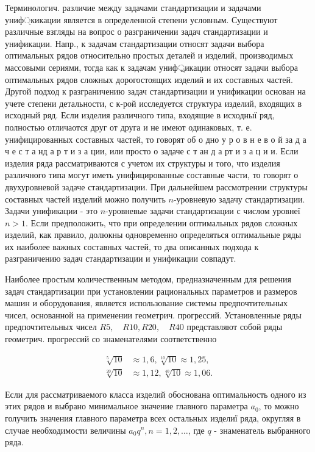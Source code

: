 \documentclass[10pt]{article}
\begin{document}
Терминологич. различие между задачами стандартизации и задачами униф্кикации является в определенноӥ степени условным. Существуют различные взгляды на вопрос о разграничении задач стандартизации и унификации. Напр., к задачам стандартизации относят задачи выбора оптимальных рядов относительно простых деталей и изделий, производимых массовыми сериями, тогда как к задачам униф্রикации относят задачи выбора оптимальных рядов сложных дорогостоящих изделий и их составных частей. Другой подход к разграничению задач стандартизации и унификации основан на учете степени детальности, с к-рой исследуется структура изделий, входящих в исходный ряд. Если изделия различного типа, входящие в исходныї ряд, полностью отличаотся друг от друга и не имеют одинаковых, т. е. унифицированных составных частей, то говорят об о дно у р о в н е в о й за д а ч е с т а нд а р т и з а ции, или просто о задаче с т ан д а рт и з а ц и и. Если изделия ряда рассматриваются с учетом их структуры и того, что изделия различного типа могут иметь унифицированные составные части, то говорят о двухуровневой задаче стандартизации. При дальнейшем рассмотрении структуры составных частей изделий можно получить $n$-уровневую задачу стандартизации. Задачи унификации - это $n$-уровневые задачи стандартизации с числом уровнеї $n>1$. Если предположить, что при определении оптимальных рядов сложных изделий, как правило, долюкны одновременно определяться оптимальные ряды их наиболее важных составных частей, то два описанных подхода к разграничению задач стандартизации и унификации совпадут.



Наиболее простым количественным методом, предназначенным для решения задач стандартизации при установлении рациональных параметров и размеров машин и оборудования, является использование системы предпочтительных чисел, основанной на применении геометрич. прогрессий. Установленные ряды предпочтительных чисел $R 5, \quad R 10, R 20, \quad R 40$ представляют собой ряды геометрич. прогрессий со знаменателями соответственно



\[

\begin{aligned}

\sqrt[5]{10} & \approx 1,6, \sqrt[10]{10} \approx 1,25, \\

\sqrt[20]{10} & \approx 1,12, \sqrt[40]{10} \approx 1,06 .

\end{aligned}

\]



Если для рассматриваемого класса изделий обоснована оптимальность одного из этих рядов и выбрано минимальное значение главного параметра $a_{0}$, то можно голучить значения главного параметра всех остальных изделиї ряда, округляя в случае необходимости величины $a_{0} q^{n}, n=1,2, \ldots$, где $q$ - знаменатель выбранного ряда.
\end{document}
